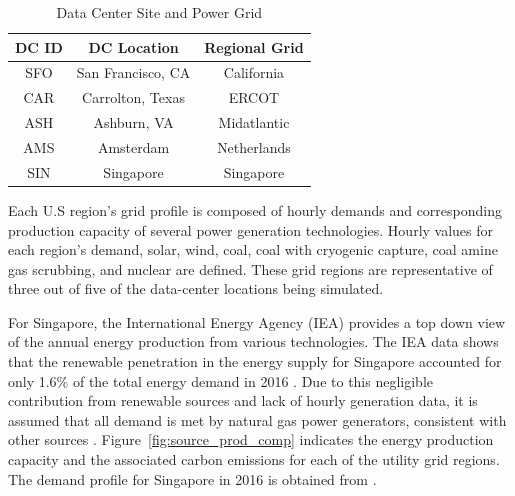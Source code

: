 \begin{table}[ht]
  \vspace{-10 pt}
  \caption{Data Center Site and Power Grid}
  \label{table:tab02}
  \centering
  \begin{tabular}{| c | c | c |  }
    \hline
    \bf{DC ID} & \bf{DC Location} & \bf{Regional Grid} \\
    \hline
    SFO & San Francisco, CA & California \\
    \hline
    CAR & Carrolton, Texas & ERCOT \\
    \hline
    ASH & Ashburn, VA & Midatlantic \\
    \hline
    AMS & Amsterdam & Netherlands \\
    \hline
    SIN & Singapore & Singapore \\
    \hline
  \end{tabular}
  \vspace{-10 pt}   %
  \end{table}

  Each U.S region's grid profile is composed of hourly demands and corresponding production capacity of several power generation technologies. Hourly values for each region’s demand, solar, wind, coal, coal with cryogenic capture, coal amine gas scrubbing, and nuclear are defined. These grid regions are representative of three out of five of the data-center locations being simulated. 
  
  For Singapore, the International Energy Agency (IEA) provides a top down view of the annual energy production from various technologies. The IEA data shows that the renewable penetration in the energy supply for Singapore accounted for only 1.6\% of the total energy demand in 2016  \citep{IEA17}. Due to this negligible contribution from renewable sources and lack of hourly generation data, it is assumed that all demand is met by natural gas power generators, consistent with other sources \citep{eia20}. Figure~\ref{fig:source_prod_comp} indicates the energy production capacity and the associated carbon emissions for each of the utility grid regions. The demand profile for Singapore in 2016 is obtained from \citep{sin16}.

